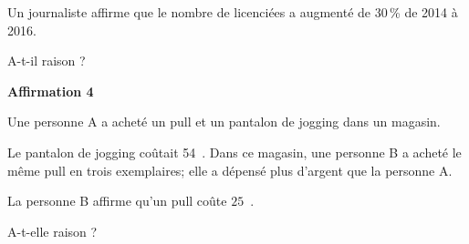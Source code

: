 \documentclass[10pt]{article}
\newcommand{\euro}{\eurologo{}}
\begin{document}
Un journaliste affirme que le nombre de licenciées a augmenté de $30$\,\% de 2014 à
2016.

A-t-il raison ?

\medskip

\textbf{Affirmation 4}

\smallskip

Une personne A a acheté un pull et un pantalon de jogging dans un magasin.

Le pantalon de jogging coûtait 54~\euro. Dans ce magasin, une personne B a acheté le
même pull en trois exemplaires; elle a dépensé plus d'argent que la personne A.

La personne B affirme qu'un pull coûte $25$~\euro.

A-t-elle raison ?

\bigskip
\end{document}
